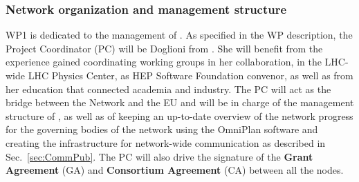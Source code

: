 

\subsubsection{Network organization and management structure}
\label{sub:networkOrganization}

WP1 is dedicated to the management of \acronym. As specified in the WP description, the Project Coordinator (PC) will be Doglioni from \lundentity. 
She will benefit from the experience gained coordinating working groups in her collaboration, in the LHC-wide LHC Physics Center, as HEP Software Foundation convenor, as well as from her education that connected academia and industry.
The PC will act as the bridge between the Network and the EU and will be in charge of the management structure of \acronym, as well as of keeping an up-to-date overview of the network progress for the governing bodies of the network using the OmniPlan software and creating the infrastructure for network-wide communication as described in Sec.~\ref{sec:CommPub}. 
The PC will also drive the signature of the \textbf{Grant Agreement} (GA) and \textbf{Consortium Agreement} (CA) between all the nodes. 
